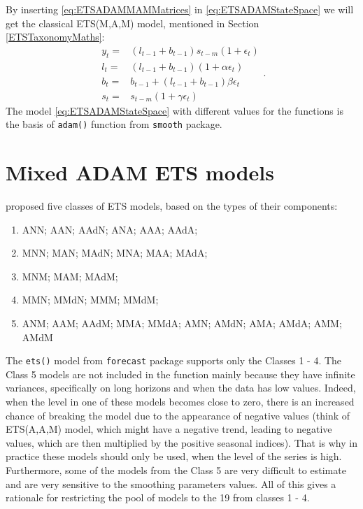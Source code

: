 \documentclass[
]{book}
\providecommand{\tightlist}{%
  \setlength{\itemsep}{0pt}\setlength{\parskip}{0pt}}
\theoremstyle{definition}
\theoremstyle{definition}
\theoremstyle{definition}
\theoremstyle{definition}
\theoremstyle{remark}
\begin{document}
By inserting \eqref{eq:ETSADAMMAMMatrices} in \eqref{eq:ETSADAMStateSpace} we will get the classical ETS(M,A,M) model, mentioned in Section \ref{ETSTaxonomyMaths}:
\begin{equation}
  \begin{aligned}
    y_{t} = & (l_{t-1} + b_{t-1}) s_{t-m}(1 + \epsilon_t) \\
    l_t = & (l_{t-1} + b_{t-1})(1 + \alpha \epsilon_t) \\
    b_t = & b_{t-1} + (l_{t-1} + b_{t-1}) \beta \epsilon_t \\
    s_t = & s_{t-m} (1 + \gamma \epsilon_t) 
  \end{aligned}.
  \label{eq:ETSADAMMAM}
\end{equation}
The model \eqref{eq:ETSADAMStateSpace} with different values for the functions is the basis of \texttt{adam()} function from \texttt{smooth} package.

\hypertarget{ADAMETSMixedModels}{%
\section{Mixed ADAM ETS models}\label{ADAMETSMixedModels}}

\citet{Hyndman2008b} proposed five classes of ETS models, based on the types of their components:

\begin{enumerate}
\def\labelenumi{\arabic{enumi}.}
\tightlist
\item
  ANN; AAN; AAdN; ANA; AAA; AAdA;
\item
  MNN; MAN; MAdN; MNA; MAA; MAdA;
\item
  MNM; MAM; MAdM;
\item
  MMN; MMdN; MMM; MMdM;
\item
  ANM; AAM; AAdM; MMA; MMdA; AMN; AMdN; AMA; AMdA; AMM; AMdM
\end{enumerate}

The \texttt{ets()} model from \texttt{forecast} package supports only the Classes 1 - 4. The Class 5 models are not included in the function mainly because they have infinite variances, specifically on long horizons and when the data has low values. Indeed, when the level in one of these models becomes close to zero, there is an increased chance of breaking the model due to the appearance of negative values (think of ETS(A,A,M) model, which might have a negative trend, leading to negative values, which are then multiplied by the positive seasonal indices). That is why in practice these models should only be used, when the level of the series is high. Furthermore, some of the models from the Class 5 are very difficult to estimate and are very sensitive to the smoothing parameters values. All of this gives a rationale for restricting the pool of models to the 19 from classes 1 - 4.
\end{document}
